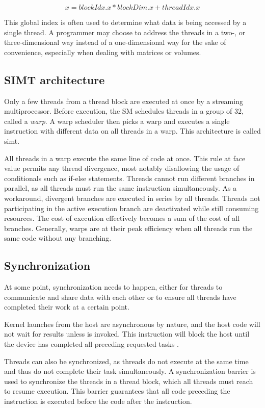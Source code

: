 $$x = blockIdx.x * blockDim.x + threadIdx.x$$

This global index is often used to determine what data is being accessed by a single thread. A programmer may choose to address the threads in a two-, or three-dimensional way instead of a one-dimensional way for the sake of convenience, especially when dealing with matrices or volumes.

\subsection{SIMT architecture}\label{subsection:simt}

Only a few threads from a thread block are executed at once by a streaming multiprocessor. Before execution, the SM schedules threads in a group of 32, called a \textit{warp}. A warp scheduler then picks a warp and executes a single instruction with different data on all threads in a warp. This architecture is called \acrfull{simt}.

All threads in a warp execute the same line of code at once. This rule at face value permits any thread divergence, most notably disallowing the usage of conditionals such as if-else statements. Threads cannot run different branches in parallel, as all threads must run the same instruction simultaneously. As a workaround, divergent branches are executed in series by all threads. Threads not participating in the active execution branch are deactivated while still consuming resources. The cost of execution effectively becomes a sum of the cost of all branches. Generally, warps are at their peak efficiency when all threads run the same code without any branching.

\subsection{Synchronization}

At some point, synchronization needs to happen, either for threads to communicate and share data with each other or to ensure all threads have completed their work at a certain point.

Kernel launches from the host are asynchronous by nature, and the host code will not wait for results unless  is invoked. This instruction will block the host until the device has completed all preceding requested tasks \cite{cudaprog}.

Threads can also be synchronized, as threads do not execute at the same time and thus do not complete their task simultaneously. A synchronization barrier  is used to synchronize the threads in a thread block, which all threads must reach to resume execution. This barrier guarantees that all code preceding the instruction is executed before the code after the instruction.

